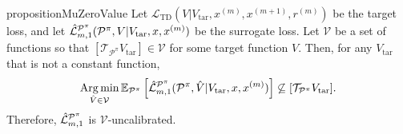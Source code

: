 \begin{restatable}{proposition}{MuZeroValue}\label{prop:cvaml:2_3}
    Let $\mathcal{L}_\mathrm{TD}(V|V_\mathrm{tar}, x^{(m)},x^{(m+1)},r^{(m)})$ be the target loss, and let $\hat{\mathcal{L}}^{\P^\pi}_{m,1}(\P^\pi,V|\allowbreak V_\mathrm{tar},x, x^{(m)})$ be the surrogate loss. 
    Let $\mathcal{V}$ be a set of functions so that $[\mathcal{T}_{\mathcal{P}^\pi}V_\mathrm{tar}] \in \mathcal{V}$ for some target function $V$.
    Then, for any $V_\mathrm{tar}$ that is not a constant function, $$ \Argmin_{\hat{V} \in \mathcal{V}} \mathbb{E}_{\P^\pi}\squareb{\hat{\mathcal{L}}^{\P^\pi}_{m,1}(\P^\pi, \hat{V}| V_\mathrm{tar}, x, x^{(m)})} \not \subseteq [\mathcal{T}_{\P^\pi} V_\mathrm{tar}].$$
    Therefore, $\hat{\mathcal{L}}^{\P^\pi}_{m,1}$ is $\mathcal{V}$-uncalibrated.
\end{restatable}
